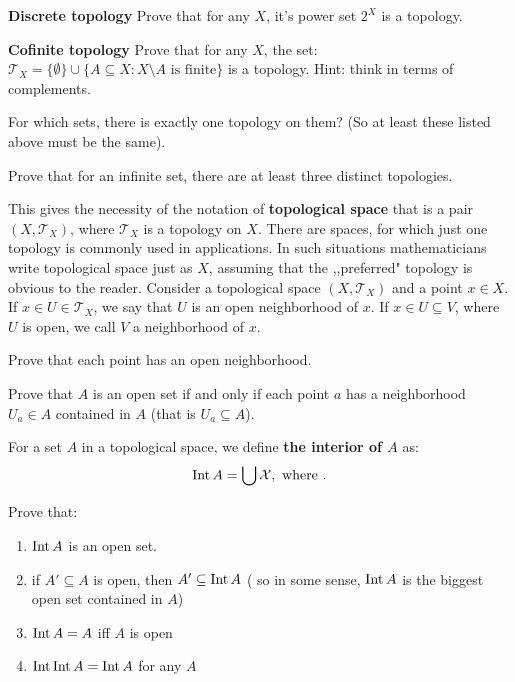 \begin{prob}
	\textbf{Discrete topology} Prove that for any $X$, it's power set $2^X$ is a topology.
\end{prob}

\begin{prob}
	\textbf{Cofinite topology} Prove that for any $X$, the set:
  $\mathcal T_X=\{\emptyset\}\cup \{A\subseteq X : X\setminus A \text{ is finite}\}$ is a topology. Hint: think in terms of complements.
\end{prob}

\begin{prob}
	For which sets, there is exactly one topology on them? (So at least
  these listed above must be the same).
\end{prob}

\begin{prob}
	Prove that for an infinite set, there are at least three distinct
  topologies.
\end{prob}

\noindent This gives the necessity of the notation of \textbf{topological space} that is a pair $(X,\mathcal T_X)$, where $\mathcal T_X$ is a topology on
$X$. There are spaces, for which just one topology is commonly used in applications. In such situations mathematicians write topological space just as
$X$, assuming that the ,,preferred" topology is obvious to the reader.
Consider a topological space $(X,\mathcal T_X)$ and a point $x\in X$.
If $x\in U\in \mathcal T_X$, we say that $U$ is an open neighborhood
of $x$. If $x\in U\subseteq V$, where $U$ is open, we call $V$ a
neighborhood of $x$.

\begin{prob}
  Prove that each point has an open neighborhood.
\end{prob}

\begin{prob}
  Prove that $A$ is an open set if and only if each point $a$ has
  a neighborhood $U_a\in A$ contained in $A$
  (that is $U_a\subseteq A$).
\end{prob}

\noindent For a set $A$ in a topological space, we define \textbf{the
interior of $A$} as:
$$\text{Int\,} A=\bigcup \mathcal X, \text{ where }.$$

\begin{prob}
  Prove that:
  \begin{enumerate}
    \item $\text{Int\,} A$ is an open set.
    \item if $A'\subseteq A$ is open, then $A'\subseteq \text{Int\,} A$ (
    so in some sense, $\text{Int\,} A$ is the biggest open set contained in
    $A$)
    \item $\text{Int\,} A = A$ iff $A$ is open
    \item $\text{Int\,} \text{Int\,} A = \text{Int\,} A$ for any $A$
  \end{enumerate}
\end{prob}

